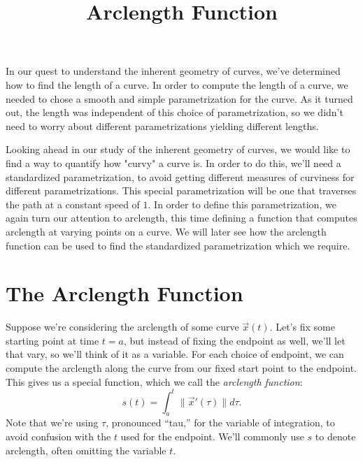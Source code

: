 \documentclass{ximera}
\title{Arclength Function}
\begin{document}
\begin{abstract}
\end{abstract}
\maketitle

In our quest to understand the inherent geometry of curves, we've determined how to find the length of a curve. In order to compute the length of a curve, we needed to chose a smooth and simple parametrization for the curve. As it turned out, the length was independent of this choice of parametrization, so we didn't need to worry about different parametrizations yielding different lengths.

Looking ahead in our study of the inherent geometry of curves, we would like to find a way to quantify how "curvy" a curve is. In order to do this, we'll need a standardized parametrization, to avoid getting different measures of curviness for different parametrizations. This special parametrization will be one that traverses the path at a constant speed of $1$. In order to define this parametrization, we again turn our attention to arclength, this time defining a function that computes arclength at varying points on a curve. We will later see how the arclength function can be used to find the standardized parametrization which we require.

\section*{The Arclength Function}

Suppose we're considering the arclength of some curve $\vec{x}(t)$. Let's fix some starting point at time $t=a$, but instead of fixing the endpoint as well, we'll let that vary, so we'll think of it as a variable. For each choice of endpoint, we can compute the arclength along the curve from our fixed start point to the endpoint. This gives us a special function, which we call the \emph{arclength function}:
\[
s(t) = \int_a^t \|\vec{x}'(\tau)\|d\tau.
\]
Note that we're using $\tau$, pronounced ``tau,'' for the variable of integration, to avoid confusion with the $t$ used for the endpoint. We'll commonly use $s$ to denote arclength, often omitting the variable $t$.

\begin{image}
\end{image}
\end{document}
